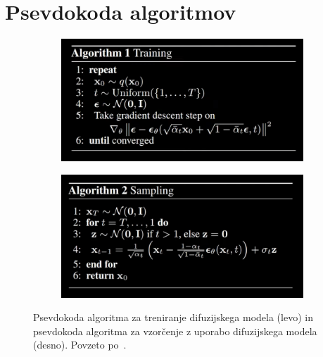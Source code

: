 \documentclass[12pt, a4paper]{article}
\begin{document}
\newpage
\section{Psevdokoda algoritmov}
\label{sec:pseudocode}


\begin{figure}[ht]
    \begin{center}
    \begin{subfigure}[b]{0.9\textwidth}
    \centerline{\includegraphics[width=\textwidth]{Images/ALG1.png}}
    \end{subfigure}\quad
    \begin{subfigure}[b]{0.9\textwidth}
    \centerline{\includegraphics[width=\textwidth]{Images/ALG2.png}}
    \end{subfigure}
    
    \caption{Psevdokoda algoritma za treniranje difuzijskega modela (levo) in psevdokoda algoritma za vzorčenje z uporabo difuzijskega modela (desno). Povzeto po~\cite{DDPM}.}
    \label{fig:algorithms}
    \end{center}
    
    \vskip -0.2in
\end{figure}
\end{document}
